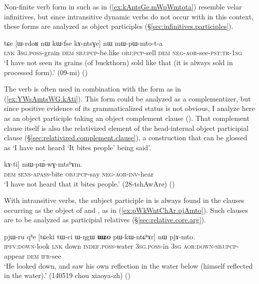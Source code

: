 Non-finite verb form in  such as  in (\ref{ex:kAntsGe.mWpWmtota}) resemble velar infinitives, but since intransitive dynamic verbs do not occur with  in this context, these forms are analyzed as object participles (§\ref{sec:infinitives.participles}).


\begin{exe}
\ex \label{ex:kAntsGe.mWpWmtota}
 \gll tɕe [ɯ-rdoʁ nɯ kɯ-fse kɤ-ntsɣe] nɯ mɯ-pɯ-mto-t-a  \\
 \textsc{lnk} \textsc{3sg}.\textsc{poss}-grain \textsc{dem} \textsc{sbj}:\textsc{pcp}-be.like \textsc{obj}:\textsc{pcp}-sell \textsc{dem} \textsc{neg}-\textsc{aor}-see-\textsc{pst}:\textsc{tr}-\textsc{1sg} \\
 \glt `I have not seen its grains (of buckthorn) sold like that (it is always sold in processed form).' (09-mi)
 ()
\end{exe}

The verb  is often used in combination with the form  as in (\ref{ex:YWsAmtsWG.kAti}). This form could be analyzed as a complementizer, but since positive evidence of its grammaticalized status is not obvious, I analyze  here as an object participle taking an object complement clause (). That complement clause itself is also the relativized element of the head-internal object participial clause  (§\ref{sec:relativized.complement.clause}), a construction that can be glossed as `I have not heard `It bites people' being said'.

\begin{exe}
\ex \label{ex:YWsAmtsWG.kAti}
 \gll [[nɯ ɲɯ-sɤ-mtsɯɣ] kɤ-ti] mɯ-pɯ́-wɣ-mtsʰɤm. \\
 \textsc{dem} \textsc{sens}-\textsc{apass}-bite \textsc{obj}:\textsc{pcp}-say \textsc{neg}-\textsc{aor}-\textsc{inv}-hear \\
 \glt `I have not heard that it bites people.' (28-tshAwAre)
 ()
\end{exe}
 
With intransitive verbs, the subject participle in  is always found in the clauses occurring as the object of  and , as in (\ref{ex:pWkWntChAr.pjAmto}). Such clauses are to be analyzed as participial relatives (§\ref{sec:relative.core.arg}).

\begin{exe}
\ex \label{ex:pWkWntChAr.pjAmto}
 \gll pjɯ-ru qʰe [tɕeki tɯ-ci ɯ-ŋgɯ \textbf{ɯʑo} pɯ-kɯ-ntɕʰɤr] nɯ pjɤ-mto. \\
 \textsc{ipfv}:\textsc{down}-look \textsc{lnk} down \textsc{indef}.\textsc{poss}-water \textsc{3sg}.\textsc{poss}-in \textsc{3sg} \textsc{aor}:\textsc{down}-\textsc{sbj}:\textsc{pcp}-appear \textsc{dem} \textsc{ifr}-see \\
 \glt  `He looked down, and saw his own reflection in the water below (himself reflected in the water).' (140519 chou xiaoya-zh)
()
 \end{exe}
 
